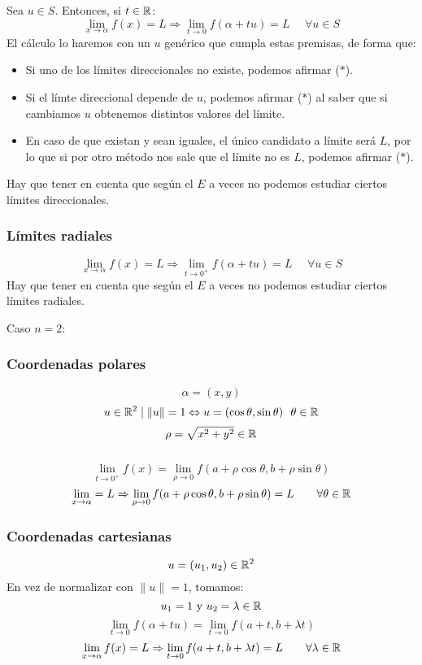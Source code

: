 Sea $u \in S$. Entonces, si $t \in \mathbb R$:
$$\lim_{x \to \alpha}f(x) = L \Rightarrow \lim_{t \to 0}f(\alpha + tu) = L~~~~~~\forall u \in S$$
El cálculo lo haremos con un $u$ genérico que cumpla estas premisas, de forma que:
\begin{itemize}
    \item Si uno de los límites direccionales no existe, podemos afirmar ($\ast$).
    \item Si el límte direccional depende de $u$, podemos afirmar ($\ast$) al saber que si cambiamos
          $u$ obtenemos distintos valores del límite.
    \item En caso de que existan y sean iguales, el único candidato a límite será $L$, por lo que si por
          otro método nos sale que el límite no es $L$, podemos afirmar ($\ast$).
\end{itemize}

Hay que tener en cuenta que según el $E$ a veces no podemos estudiar ciertos límites direccionales.

\subsubsection{Límites radiales}
$$\lim_{x \to \alpha}f(x) = L \Rightarrow \lim_{t \to 0^{+}}f(\alpha + tu) = L~~~~~~\forall u \in S$$
Hay que tener en cuenta que según el $E$ a veces no podemos estudiar ciertos límites radiales.


Caso $n=2$:
\subsubsection{Coordenadas polares}
$$\alpha = (x,y)$$
$$u \in \mathbb R^2 \mid \|u\| = 1 \Leftrightarrow u =(\cos\theta,\sin\theta)~~\theta \in \mathbb R$$
$$\rho = \sqrt{x^2+y^2} \in \mathbb R$$
\ \\
$$\lim_{t \to 0^{+}}f(x) = \lim_{\rho \to 0}f(a+\rho \cos\theta, b+\rho \sin\theta)$$
$$\lim_{x \to \alpha}=L \Rightarrow \lim_{\rho \rightarrow 0}f(a+\rho \cos\theta, b+\rho \sin\theta)=L~~~
    ~~~ \forall \theta \in \mathbb R$$

\subsubsection{Coordenadas cartesianas}
$$u=(u_1, u_2) \in \mathbb R^2$$
En vez de normalizar con $\|u\|=1$, tomamos:
$$u_1 = 1 \mbox{ y } u_2 = \lambda \in \mathbb R$$
$$\lim_{t \to 0}f(\alpha + tu) = \lim_{t \to 0}f(a+t,b+\lambda t)$$
$$\lim_{x \to \alpha}f(x) = L \Rightarrow \lim_{t \to 0}f(a+t,b+\lambda t) = L~~~~~~ \forall \lambda \in \mathbb R$$

